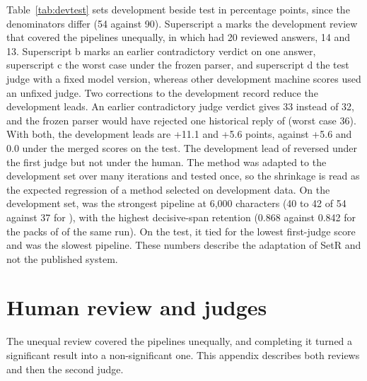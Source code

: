Table~\ref{tab:devtest} sets development beside test in percentage points, since the denominators differ (54 against 90).
Superscript a marks the development review that covered the pipelines unequally, in which \lexb{} had 20 reviewed answers, \hybrid{} 14 and \hr{} 13.
Superscript b marks an earlier contradictory verdict on one \hr{} answer, superscript c the worst case under the frozen parser, and superscript d the test judge with a fixed model version, whereas other development machine scores used an unfixed judge.
Two corrections to the development record reduce the development leads.
An earlier contradictory judge verdict gives \hr{} 33 instead of 32, and the frozen parser would have rejected one historical reply of \lexb{} (worst case 36).
With both, the development leads are +11.1 and +5.6 points, against +5.6 and 0.0 under the merged scores on the test.
The development lead of \setr{} reversed under the first judge but not under the human.
The method was adapted to the development set over many iterations and tested once, so the shrinkage is read as the expected regression of a method selected on development data.
On the development set, \setr{} was the strongest pipeline at 6,000 characters (40 to 42 of 54 against 37 for \lexb{}), with the highest decisive-span retention (0.868 against 0.842 for the packs of \lexb{} of the same run).
On the test, it tied \hybrid{} for the lowest first-judge score and was the slowest pipeline.
These numbers describe the adaptation of SetR and not the published system.


\section{Human review and judges}
\label{app:review}
The unequal review covered the pipelines unequally, and completing it turned a significant result into a non-significant one.
This appendix describes both reviews and then the second judge.


